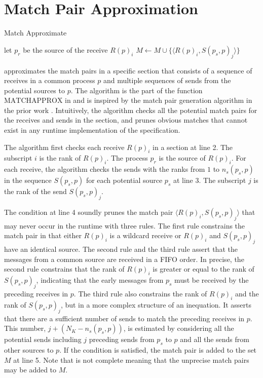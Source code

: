 \section{Match Pair Approximation}

\begin{algorithm}
\caption{Match Approximate}\label{algo:match}
\begin{algorithmic}[1]
\State let $p_r$ be the source of the receive $R(p)_i$
\State $M\gets M\cup\{\langle R(p)_i,S(p_s,p)_j \rangle\}$
\EndIf
\EndFor
\EndFor
\end{algorithmic}
\end{algorithm}

 approximates the match pairs in a specific section that consists of a sequence of receives in a common process $p$ and multiple sequences of sends from the potential sources to $p$.
The algorithm is the part of the function $\mathrm{MATCHAPPROX}$ in  and is inspired by the match pair generation algorithm in the prior work \cite{}. 
Intuitively, the algorithm checks all the potential match pairs for the receives and sends in the section, and prunes obvious matches that cannot exist in any runtime implementation of the specification.

The algorithm first checks each receive $R(p)_i$ in a section at line 2. The subscript $i$ is the rank of $R(p)_i$. The process $p_r$ is the source of $R(p)_i$.
For each receive, the algorithm checks the sends with the ranks from $1$ to $n_s(p_s,p)$ in the sequence $S(p_s,p)$ for each potential source $p_s$ at line 3.
The subscript $j$ is the rank of the send $S(p_s,p)_j$. 

The condition at line 4 soundly prunes the match pair $\langle R(p)_i,S(p_s,p)_j\rangle$ that may never occur in the runtime with three rules. The first rule constrains the match pair in that either $R(p)_i$ is a wildcard receive or $R(p)_i$ and $S(p_s,p)_j$ have an identical source. The second rule and the third rule assert that the messages from a common source are received in a FIFO order. In precise, the second rule constrains that the rank of $R(p)_i$ is greater or equal to the rank of $S(p_s,p)_j$, indicating that the early messages from $p_s$ must be received by the preceding receives in $p$. The third rule also constrains the rank of $R(p)_i$ and the rank of $S(p_s,p)_j$, but in a more complex structure of an inequation. It asserts that there are a sufficient number of sends to match the preceding receives in $p$. This number, $j + (N_K - \mathit{n_s}(p_s,p))$, is estimated by considering all the potential sends including $j$ preceding sends from $p_s$ to $p$ and all the sends from other sources to $p$.
If the condition is satisfied, the match pair is added to the set $M$ at line 5. Note that  is not complete meaning that the unprecise match pairs may be added to $M$.

